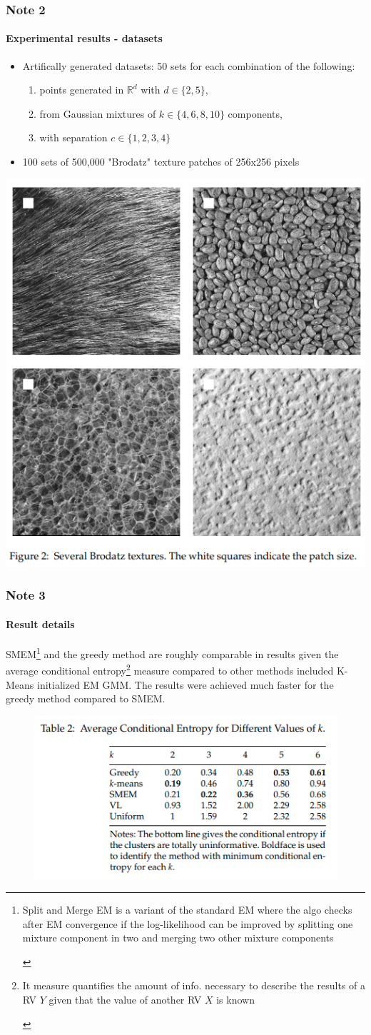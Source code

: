 \documentclass[aspectratio=43]{beamer}
\begin{document}
\begin{frame}
\frametitle{Note 2}
\framesubtitle{Experimental results - datasets}
    \begin{small}\begin{itemize}
      \item Artifically generated datasets: 50 sets for each combination of the following:
      \begin{small}\begin{enumerate}
        \item points generated in $\mathbb{R}^d$ with $d\in\{2,5\}$,
        \item from Gaussian mixtures of $k\in \{4,6,8,10\}$ components,
        \item with separation $c\in\{1,2,3,4\}$
      \end{enumerate}\end{small}
      \item 100 sets of 500,000 "Brodatz" texture patches of 256x256 pixels
    \end{itemize}\end{small}
    \centering \includegraphics[width=0.4\linewidth]{imagens/brodatz.png}
\end{frame}

\begin{frame}
\frametitle{Note 3}
\framesubtitle{Result details}
SMEM\footnote{\begin{scriptsize}Split and Merge EM is a variant of the standard EM where the algo checks after EM convergence if the log-likelihood can be improved by splitting one mixture component in two and merging two other mixture components\end{scriptsize}} and the greedy method are roughly comparable in results given the average conditional entropy\footnote{\begin{scriptsize}It measure quantifies the amount of info. necessary to describe the results of a RV $Y$ given that the value of another RV $X$ is known\end{scriptsize}} measure compared to other methods included K-Means initialized EM GMM. The results were achieved much faster for the greedy method compared to SMEM.
\begin{figure}
    \centering
    \includegraphics[width=0.4\linewidth]{imagens/results.png}
\end{figure}
\end{frame}
\end{document}
